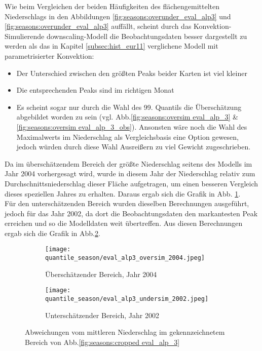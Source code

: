 Wie beim Vergleichen der beiden Häufigkeiten des flächengemittelten Niederschlags in den Abbildungen \ref{fig:seasons:overunder_eval_alp3} und \ref{fig:seasons:overunder_eval_alp3} auffällt, scheint durch das Konvektion-Simulierende downscaling-Modell die Beobachtungsdaten besser dargestellt zu werden als das in Kapitel \ref{subsec:hist_eur11} verglichene Modell mit parametrisierter Konvektion:
\begin{itemize}
	\item Der Unterschied zwischen den größten Peaks beider Karten ist viel kleiner
	\item Die entsprechenden Peaks sind im richtigen Monat
	\item Es scheint sogar nur durch die Wahl des 99. Quantils die Überschätzung abgebildet worden zu sein (vgl. Abb.\ref{fig:seasons:oversim eval_alp_3} \& \ref{fig:seasons:oversim eval_alp_3_obs}). Ansonsten wäre noch die Wahl des Maximalwerts im Niederschlag als Vergleichsbasis eine Option gewesen, jedoch würden durch diese Wahl Ausreißern zu viel Gewicht zugeschrieben.
\end{itemize}
Da im überschätzendem Bereich der größte Niederschlag seitens des Modells im Jahr 2004 vorhergesagt wird, wurde in diesem Jahr der Niederschlag relativ zum Durchschnittsniederschlag dieser Fläche aufgetragen, um einen besseren Vergleich dieses speziellen Jahres zu erhalten. Daraus ergab sich die Grafik in Abb. \ref{fig:seasons:pr_oversim_eval_alp3}.\\
Für den unterschätzenden Bereich wurden dieselben Berechnungen ausgeführt, jedoch für das Jahr 2002, da dort die Beobachtungsdaten den markantesten Peak erreichen und so die Modelldaten weit übertreffen. Aus diesen Berechnungen ergab sich die Grafik in Abb.\ref{fig:seasons:pr_undersim_eval_alp3}.\\
\begin{figure}[h]
	\begin{subfigure}{0.49\textwidth}
		\texttt{[image: quantile\_season/eval\_alp3\_oversim\_2004.jpeg]}
		\caption{Überschätzender Bereich, Jahr 2004}
		\label{fig:seasons:pr_oversim_eval_alp3}
	\end{subfigure}
	\begin{subfigure}{0.49\textwidth}
		\texttt{[image: quantile\_season/eval\_alp3\_undersim\_2002.jpeg]}
		\caption{Unterschätzender Bereich, Jahr 2002}
		\label{fig:seasons:pr_undersim_eval_alp3}
	\end{subfigure}
	\caption{Abweichungen vom mittleren Niederschlag im gekennzeichnetem Bereich von Abb.\ref{fig:seasons:cropped eval_alp_3}}
	\label{fig:seasons:pr_over_undersim_eval_alp3}
\end{figure}
